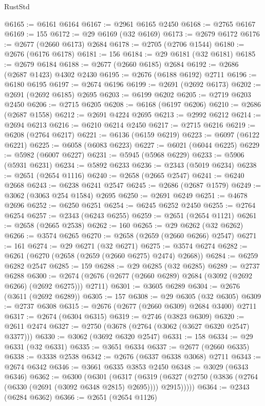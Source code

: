 \begin{lexlean}{RustStd}
\begin{coremodule}
{\begin{coremodule}
{{{{{{{{{{{{{{{{{{{{{{{{{{{{{{{{{{{{{{{{{{{{{{{{{{{{{{{@6165 := @6161 @6164
@6167 := @2961 @6165 @2450
@6168 := @2765 @6167
@6169 := 155
@6172 := @29 @6169 (@32 @6169)
@6173 := @2679 @6172
@6176 := @2677 (@2660 @6173) @2684
@6178 := @2705 (@2706 @1544)
@6180 := @2676 (@6176 @6178)
@6181 := 156
@6184 := @29 @6181 (@32 @6181)
@6185 := @2679 @6184
@6188 := @2677 (@2660 @6185) @2684
@6192 := @2686 (@2687 @1423) @4302 @2430
@6195 := @2676 (@6188 @6192) @2711
@6196 := @6180 @6195
@6197 := @2674 @6196
@6199 := @2691 (@2692 @6173)
@6202 := @2691 (@2692 @6185) @2695
@6203 := @6199 @6202
@6205 := @2719 @6203 @2450
@6206 := @2715 @6205
@6208 := @6168 (@6197 @6206)
@6210 := @2686 (@2687 @1558)
@6212 := @2691 @4224 @2695
@6213 := @2992 @6212
@6214 := @2694 @6213
@6216 := @6210 @6214 @2450
@6217 := @2715 @6216
@6219 := @6208 (@2764 @6217)
@6221 := @6136 (@6159 @6219)
@6223 := @6097 (@6122 @6221)
@6225 := @6058 (@6083 @6223)
@6227 := @6021 (@6044 @6225)
@6229 := @5982 (@6007 @6227)
@6231 := @5945 (@5968 @6229)
@6233 := @5906 (@5931 @6231)
@6234 := @5892 @6233
@6236 := @2343 (@5019 @6234)
@6238 := @2651 (@2654 @1116)
@6240 := @2658 (@2665 @2547)
@6241 := @6240 @2668
@6243 := @6238 @6241 @2547
@6245 := @2686 (@2687 @1579)
@6249 := @3062 (@3063 @254 @1584) @2695
@6250 := @2691 @6249
@6251 := @4678 @2696
@6252 := @6250 @6251
@6254 := @6245 @6252 @2450
@6255 := @2764 @6254
@6257 := @2343 (@6243 @6255)
@6259 := @2651 (@2654 @1121)
@6261 := @2658 (@2665 @2538)
@6262 := 160
@6265 := @29 @6262 (@32 @6262)
@6266 := @3574 @6265
@6270 := @2658 (@2659 (@2660 @6266) @2547)
@6271 := 161
@6274 := @29 @6271 (@32 @6271)
@6275 := @3574 @6274
@6282 := @6261 (@6270 (@2658 (@2659 (@2660 @6275) @2474) @2668))
@6284 := @6259 @6282 @2547
@6285 := 159
@6288 := @29 @6285 (@32 @6285)
@6289 := @2737 @6288
@6300 := @2674 (@2676 (@2677 (@2660 @6289) @2684 (@3092 (@2692 @6266) (@2692 @6275))) @2711)
@6301 := @3605 @6289
@6304 := @2676 (@3611 (@2692 @6289))
@6305 := 157
@6308 := @29 @6305 (@32 @6305)
@6309 := @2737 @6308
@6315 := @2676 (@2677 (@2660 @6309) @2684 @3400) @2711
@6317 := @2674 (@6304 @6315)
@6319 := @2746 (@3823 @6309)
@6320 := @2611 @2474
@6327 := @2750 (@3678 (@2764 (@3062 (@3627 @6320 @2547) @3377)))
@6330 := @3062 (@3692 @6320 @2547)
@6331 := 158
@6334 := @29 @6331 (@32 @6331)
@6335 := @3651 @6334
@6337 := @2677 (@2660 @6335)
@6338 := @3338 @2538
@6342 := @2676 (@6337 @6338 @3068) @2711
@6343 := @2674 @6342
@6346 := @3661 @6335 @3853 @2450
@6348 := @3029 (@6343 @6346)
@6362 := @6300
    (@6301
      (@6317
        (@6319 (@6327 (@2750 (@3836 (@2764 (@6330 (@2691 (@3092 @6348 @2815) @2695)))) @2915)))))
@6364 := @2343 (@6284 @6362)
@6366 := @2651 (@2654 @1126)
}}}}}}}}}}}}}}}}}}}}}}}}}}}}}}}}}}}}}}}}}}}}}}}}}}}}}}}
\end{coremodule}}
\end{coremodule}
\end{lexlean}
